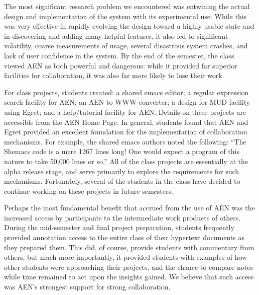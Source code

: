 The most significant research problem we encountered was entwining the
actual design and implementation of the system with its experimental
use. While this was very effective in rapidly evolving the design toward a
highly usable state and in discovering and adding many helpful features, it
also led to significant volatility, coarse measurements of usage, several
disastrous system crashes, and lack of user confidence in the system.  By
the end of the semester, the class viewed AEN as both powerful and
dangerous: while it provided far superior facilities for collaboration, it
was also far more likely to lose their work.

For class projects, students created: a shared emacs editor; a regular
expression search facility for AEN; an AEN to WWW converter; a design for
MUD facility using Egret; and a help/tutorial facility for AEN.  Details on
these projects are accessible from the AEN Home Page.  In general, students
found that AEN and Egret provided an excellent foundation for the
implementation of collaboration mechanisms. For example, the shared emacs
authors noted the following: ``The Shemacs code is a mere 1267 lines long!
One would expect a program of this nature to take 50,000 lines or so.''
All of the class projects are essentially at the alpha release stage, and
serve primarily to explore the requirements for such mechanisms.
Fortunately, several of the students in the class have decided to continue
working on these projects in future semesters.

Perhaps the most fundamental benefit that accrued from the use of AEN was
the increased access by participants to the intermediate work products of
others.  During the mid-semester and final project preparation, students
frequently provided annotation access to the entire class of their
hypertext documents as they prepared them.  This did, of course, provide
students with commentary from others, but much more importantly, it
provided students with examples of how other students were approaching
their projects, and the chance to compare notes while time remained to act
upon the insights gained.  We believe that such access was AEN's strongest
support for strong collaboration.











